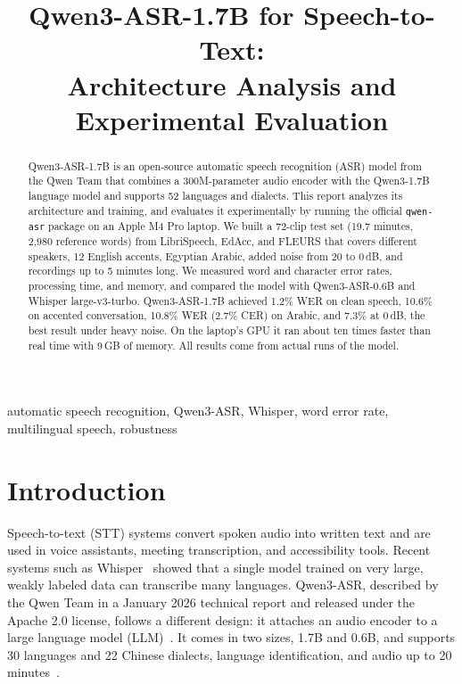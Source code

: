 \documentclass[conference]{IEEEtran}
\begin{document}
\title{Qwen3-ASR-1.7B for Speech-to-Text:\\Architecture Analysis and Experimental Evaluation}

\author{
}

\maketitle

\begin{abstract}
Qwen3-ASR-1.7B is an open-source automatic speech recognition (ASR) model from the Qwen Team that combines a 300M-parameter audio encoder with the Qwen3-1.7B language model and supports 52 languages and dialects. This report analyzes its architecture and training, and evaluates it experimentally by running the official \texttt{qwen-asr} package on an Apple M4 Pro laptop. We built a 72-clip test set (19.7 minutes, 2,980 reference words) from LibriSpeech, EdAcc, and FLEURS that covers different speakers, 12 English accents, Egyptian Arabic, added noise from 20 to 0\,dB, and recordings up to 5 minutes long. We measured word and character error rates, processing time, and memory, and compared the model with Qwen3-ASR-0.6B and Whisper large-v3-turbo. Qwen3-ASR-1.7B achieved 1.2\% WER on clean speech, 10.6\% on accented conversation, 10.8\% WER (2.7\% CER) on Arabic, and 7.3\% at 0\,dB, the best result under heavy noise. On the laptop's GPU it ran about ten times faster than real time with 9\,GB of memory. All results come from actual runs of the model.
\end{abstract}

\begin{IEEEkeywords}
automatic speech recognition, Qwen3-ASR, Whisper, word error rate, multilingual speech, robustness
\end{IEEEkeywords}

\section{Introduction}
Speech-to-text (STT) systems convert spoken audio into written text and are used in voice assistants, meeting transcription, and accessibility tools. Recent systems such as Whisper~\cite{whisper} showed that a single model trained on very large, weakly labeled data can transcribe many languages. Qwen3-ASR, described by the Qwen Team in a January 2026 technical report and released under the Apache 2.0 license, follows a different design: it attaches an audio encoder to a large language model (LLM)~\cite{qwen3asr,qwen3asrgit}. It comes in two sizes, 1.7B and 0.6B, and supports 30 languages and 22 Chinese dialects, language identification, and audio up to 20 minutes~\cite{qwen3asr}.
\end{document}
